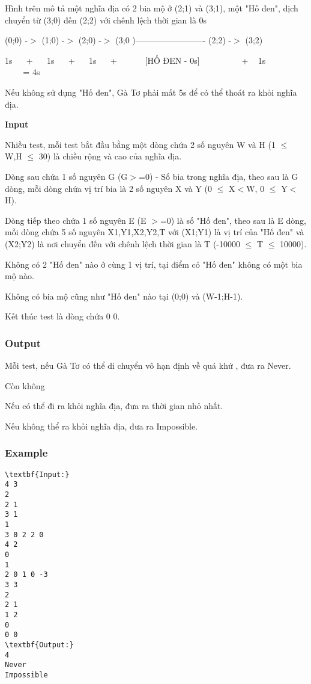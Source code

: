 Hình trên mô tả một nghĩa địa có 2 bia mộ ở (2;1) và (3;1), một "Hố đen", dịch chuyển từ (3;0) đến (2;2) với chênh lệch thời gian là 0s

(0;0) -$>$ (1;0) -$>$ (2;0) -$>$ (3;0 )------------------------- (2;2) -$>$ (3;2)

1s    +    1s    +    1s    +        [HỐ ĐEN - 0s]            +   1s                = 4s

Nếu không sử dụng "Hố đen", Gà Tơ phải mất 5s để có thể thoát ra khỏi nghĩa địa.

\textbf{Input }

Nhiều test, mỗi test bắt đầu bằng một dòng chứa 2 số nguyên W và H (1 $\le$  W,H  $\le$  30) là chiều rộng và cao của nghĩa địa.

Dòng sau chứa 1 số nguyên G (G$>$=0) - Số bia trong nghĩa địa, theo sau là G dòng, mỗi dòng chứa vị trí bia là 2 số nguyên X và Y (0 $\le$ X$<$W, 0 $\le$ Y$<$H).

Dòng tiếp theo chứa 1 số nguyên E (E $>$=0) là số "Hố đen", theo sau là E dòng, mỗi dòng chứa 5 số nguyên X1,Y1,X2,Y2,T với (X1;Y1) là vị trí của "Hố đen" và (X2;Y2) là nơi chuyển đến với chênh lệch thời gian là T (-10000  $\le$  T  $\le$  10000).

Không có 2 "Hố đen" nào ở cùng 1 vị trí, tại điểm có "Hố đen" không có một bia mộ nào.

Không có bia mộ cũng như "Hố đen" nào tại (0;0) và (W-1;H-1).

Kết thúc test là dòng chứa 0 0.

\subsubsection{Output}

Mỗi test, nếu Gà Tơ có thể di chuyển vô hạn định về quá khứ , đưa ra Never.

Còn không

Nếu có thể đi ra khỏi nghĩa địa, đưa ra thời gian nhỏ nhất.

Nếu không thể ra khỏi nghĩa địa, đưa ra Impossible.

\subsubsection{Example}
\begin{verbatim}
\textbf{Input:}
4 3
2
2 1
3 1
1
3 0 2 2 0
4 2
0
1
2 0 1 0 -3
3 3
2
2 1
1 2
0
0 0
\textbf{Output:}
4
Never
Impossible\end{verbatim}
